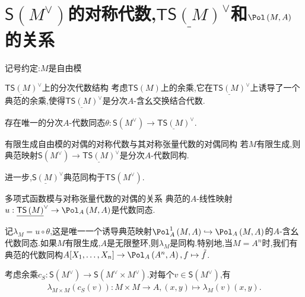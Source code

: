 \section{\texorpdfstring{$\mathsf{S}\left(M^{\vee}\right)$}{M*}的对称代数,\texorpdfstring{$\underline{\mathsf{TS}\left(M\right)}^{\vee}$}{TS(M)的分次对偶}和\texorpdfstring{$\Pol\left(M,A\right)$}{Pol(M,A)}的关系}

记号约定:$M$是自由模

\begin{definition}{$\underline{\mathsf{TS}\left(M\right)}^{\vee}$上的分次代数结构}{}
	考虑$\mathsf{TS}\left(M\right)$上的余乘,它在$\underline{\mathsf{TS}\left(M\right)}^{\vee}$上诱导了一个典范的余乘,使得$\underline{\mathsf{TS}\left(M\right)}^{\vee}$是分次$A$-含幺交换结合代数.
\end{definition}

\begin{proposition}{}{}
	存在唯一的分次$A$-代数同态$\theta:\mathsf{S}\left(M^{\vee}\right)\to\underline{\mathsf{TS}\left(M\right)}^{\vee}$.
\end{proposition}

\begin{proposition}{有限生成自由模的对偶的对称代数与其对称张量代数的对偶同构}{}
	若$M$有限生成,则典范映射$\mathsf{S}\left(M^{\vee}\right)\to\underline{\mathsf{TS}\left(M\right)}^{\vee}$是分次$A$-代数同构.
\end{proposition}

\begin{remark}{}{}
	进一步,$\underline{\mathsf{S}\left(M\right)}^{\vee}$典范同构于$\mathsf{TS}\left(M^{\vee}\right)$.
\end{remark}

\begin{proposition}{多项式函数模与对称张量代数的对偶的关系}{}
	典范的$A$-线性映射$u:\underline{\mathsf{TS}\left(M\right)}^{\vee}\to\Pol_{A}\left(M,A\right)$是代数同态.
\end{proposition}

\begin{remark}{}{}
	记$\lambda_{M}=u\circ\theta$,这是唯一一个诱导典范映射$\Pol_{A}^{1}\left(M,A\right)\hookrightarrow\Pol_{A}\left(M,A\right)$的$A$-含幺代数同态.如果$M$有限生成,$A$是无限整环,则$\lambda_{M}$是同构.特别地,当$M=A^{n}$时,我们有典范的代数同构$A[X_{1},\ldots,X_{n}]\to\Pol_{A}\left(A^{n},A\right),f\mapsto\tilde{f}$.
\end{remark}

\begin{remark}{}{}
	考虑余乘$c_{S}:\mathsf{S}\left(M^{\vee}\right)\to\mathsf{S}\left(M^{\vee}\times M^{\vee}\right)$.对每个$v\in\mathsf{S}\left(M^{\vee}\right)$,有
	\begin{align*}
		\lambda_{M\times M}\left(c_{S}\left(v\right)\right):M\times M\to A,\left(x,y\right)\mapsto\lambda_{M}\left(v\right)\left(x,y\right).
	\end{align*}
\end{remark}

